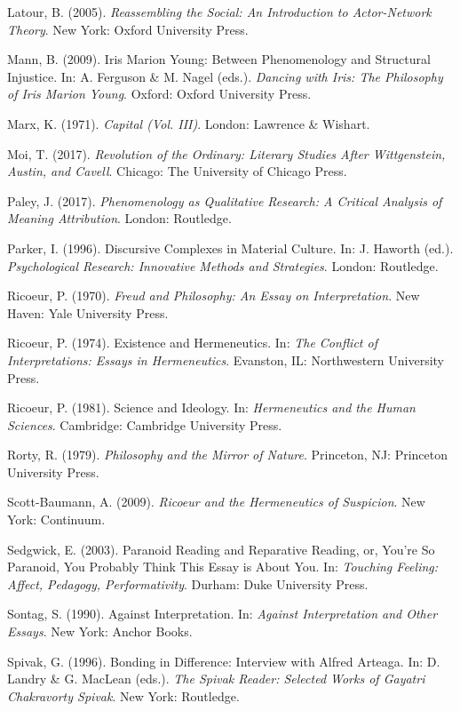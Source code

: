 \begin{thebibliography}{99}
\item Latour, B. (2005). \textit{Reassembling the Social: An Introduction to Actor-Network Theory}. New York: Oxford University Press.
\item Mann, B. (2009). Iris Marion Young: Between Phenomenology and Structural Injustice. In: A. Ferguson \& M. Nagel (eds.). \textit{Dancing with Iris: The Philosophy of Iris Marion Young}. Oxford: Oxford University Press.
\item Marx, K. (1971). \textit{Capital (Vol. III)}. London: Lawrence \& Wishart.
\item Moi, T. (2017). \textit{Revolution of the Ordinary: Literary Studies After Wittgenstein, Austin, and Cavell}. Chicago: The University of Chicago Press.
\item Paley, J. (2017). \textit{Phenomenology as Qualitative Research: A Critical Analysis of Meaning Attribution}. London: Routledge.
\item Parker, I. (1996). Discursive Complexes in Material Culture. In: J. Haworth (ed.). \textit{Psychological Research: Innovative Methods and Strategies}. London: Routledge.
\item Ricoeur, P. (1970). \textit{Freud and Philosophy: An Essay on Interpretation}. New Haven: Yale University Press.
\item Ricoeur, P. (1974). Existence and Hermeneutics. In: \textit{The Conflict of Interpretations: Essays in Hermeneutics}. Evanston, IL: Northwestern University Press.
\item Ricoeur, P. (1981). Science and Ideology. In: \textit{Hermeneutics and the Human Sciences}. Cambridge: Cambridge University Press. 
\item Rorty, R. (1979). \textit{Philosophy and the Mirror of Nature}. Princeton, NJ: Princeton University Press.
\item Scott-Baumann, A. (2009). \textit{Ricoeur and the Hermeneutics of Suspicion}. New York: Continuum.
\item Sedgwick, E. (2003). Paranoid Reading and Reparative Reading, or, You’re So Paranoid, You Probably Think This Essay is About You. In: \textit{Touching Feeling: Affect, Pedagogy, Performativity}. Durham: Duke University Press.
\item Sontag, S. (1990). Against Interpretation. In: \textit{Against Interpretation and Other Essays}. New York: Anchor Books.
\item Spivak, G. (1996). Bonding in Difference: Interview with Alfred Arteaga. In: D. Landry \& G. MacLean (eds.). \textit{The Spivak Reader: Selected Works of Gayatri Chakravorty Spivak}. New York: Routledge.

\end{thebibliography}
